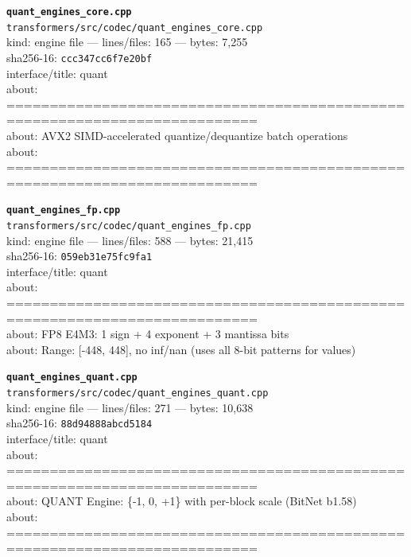 \noindent\textbf{\texttt{quant\_engines\_core.cpp}}\\
\texttt{transformers/src/codec/quant\_engines\_core.cpp}\\
kind: engine file --- lines/files: 165 --- bytes: 7,255\\
sha256-16: \texttt{ccc347cc6f7e20bf}\\
interface/title: quant\\
about: ===========================================================================\\
about: AVX2 SIMD-accelerated quantize/dequantize batch operations\\
about: ===========================================================================\\
\vspace*{6.0pt}

\noindent\textbf{\texttt{quant\_engines\_fp.cpp}}\\
\texttt{transformers/src/codec/quant\_engines\_fp.cpp}\\
kind: engine file --- lines/files: 588 --- bytes: 21,415\\
sha256-16: \texttt{059eb31e75fc9fa1}\\
interface/title: quant\\
about: ===========================================================================\\
about: FP8 E4M3: 1 sign + 4 exponent + 3 mantissa bits\\
about: Range: [-448, 448], no inf/nan (uses all 8-bit patterns for values)\\
\vspace*{6.0pt}

\noindent\textbf{\texttt{quant\_engines\_quant.cpp}}\\
\texttt{transformers/src/codec/quant\_engines\_quant.cpp}\\
kind: engine file --- lines/files: 271 --- bytes: 10,638\\
sha256-16: \texttt{88d94888abcd5184}\\
interface/title: quant\\
about: ===========================================================================\\
about: QUANT Engine: \{-1, 0, +1\} with per-block scale (BitNet b1.58)\\
about: ===========================================================================\\
\vspace*{6.0pt}
\newpage

